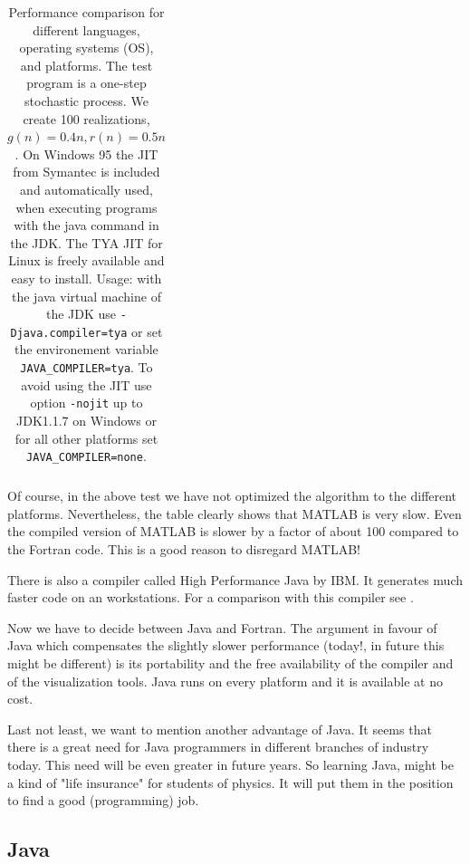 \begin{table}[htbp]
\begin{center}
\begin{tabular}{llp{3cm}|c|c}
    \end{tabular}
    \caption[Performance Table.]%
    {Performance comparison for different languages, operating
      systems (OS), and platforms.
      The test program is a one-step stochastic process. We create 100
      realizations, $g(n)=0.4n, r(n)=0.5n$. On Windows 95 the JIT from
      Symantec is included and automatically used, when executing programs
      with the java command in the JDK. The TYA JIT for Linux is freely
      available and easy to install. Usage: with the java virtual machine of
      the JDK use \texttt{-Djava.compiler=tya} or 
      set the environement variable \texttt{JAVA\_COMPILER=tya}. To avoid
      using the JIT use option \texttt{-nojit} up to JDK1.1.7 on Windows or
      for all other platforms set \texttt{JAVA\_COMPILER=none}.
      }
    \label{tab:performance}
  \end{center}
\end{table}


Of course, in the above test we have not optimized the algorithm to the 
different platforms. Nevertheless, the table clearly shows that MATLAB is 
very slow. Even the compiled version of MATLAB is slower by a factor of 
about 100 
compared to the Fortran code. This is a good reason to disregard MATLAB!

There is also a compiler called High Performance Java by IBM. It generates
much faster code on an workstations. For a comparison with this
compiler see \cite{HPJ}.

Now we have to decide between Java and Fortran. The argument in favour of 
Java which compensates the slightly slower performance (today!, in future 
this might be different) is its portability and the free availability of the
compiler and of the visualization tools. Java runs on every platform and 
it is available at no cost. 

Last not least, we want to mention another advantage of Java. It seems
\cite[]{bigbucks} that there is  a great need for Java programmers in 
different branches of industry today. This need will be even greater in future 
years. So learning Java, might be a kind of "life insurance" for students of 
physics. It will put them in the position to find a good (programming) job.


\subsection{Java}
\label{sec:Java}

